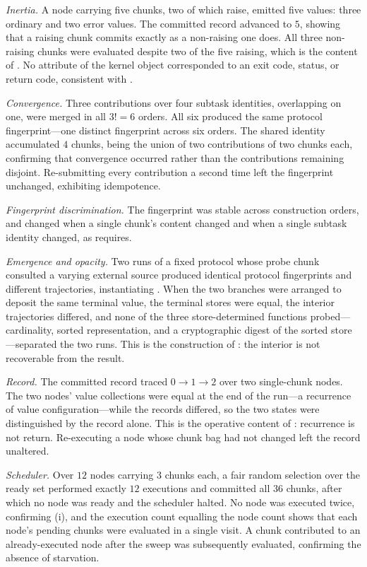 \documentclass[11pt,a4paper]{article}
\theoremstyle{thmstyle}
\theoremstyle{definition}
\theoremstyle{remark}
\begin{document}
\emph{Inertia.} A node carrying five chunks, two of which raise, emitted
five values: three ordinary and two error values. The committed record
advanced to $5$, showing that a raising chunk commits exactly as a
non-raising one does. All three non-raising chunks were evaluated despite
two of the five raising, which is the content of . No
attribute of the kernel object corresponded to an exit code, status, or
return code, consistent with .

\emph{Convergence.} Three contributions over four subtask identities,
overlapping on one, were merged in all $3!=6$ orders. All six produced the
same protocol fingerprint---one distinct fingerprint across six orders. The
shared identity accumulated $4$ chunks, being the union of two contributions
of two chunks each, confirming that convergence occurred rather than the
contributions remaining disjoint. Re-submitting every contribution a second
time left the fingerprint unchanged, exhibiting idempotence.

\emph{Fingerprint discrimination.} The fingerprint was stable across
construction orders, and changed when a single chunk's content changed and
when a single subtask identity changed, as  requires.

\emph{Emergence and opacity.} Two runs of a fixed protocol whose probe
chunk consulted a varying external source produced identical protocol
fingerprints and different trajectories, instantiating
. When the two branches were arranged to deposit the
same terminal value, the terminal stores were equal, the interior
trajectories differed, and none of the three store-determined functions
probed---cardinality, sorted representation, and a cryptographic digest of
the sorted store---separated the two runs. This is the construction of
: the interior is not recoverable from the result.

\emph{Record.} The committed record traced $0\to1\to2$ over two
single-chunk nodes. The two nodes' value collections were equal at the end
of the run---a recurrence of value configuration---while the records
differed, so the two states were distinguished by the record alone. This is
the operative content of : recurrence is not return.
Re-executing a node whose chunk bag had not changed left the record
unaltered.

\emph{Scheduler.} Over $12$ nodes carrying $3$ chunks each, a fair random
selection over the ready set performed exactly $12$ executions and committed
all $36$ chunks, after which no node was ready and the scheduler halted. No
node was executed twice, confirming (i), and the
execution count equalling the node count shows that each node's pending
chunks were evaluated in a single visit. A chunk contributed to an
already-executed node after the sweep was subsequently evaluated, confirming
the absence of starvation.
\end{document}
